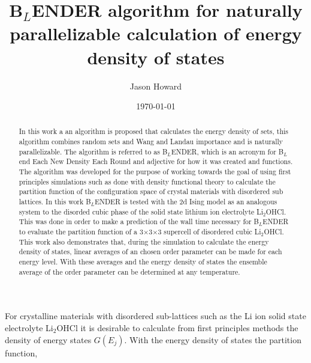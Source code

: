 \documentclass[aps,prl,reprint,superscriptaddress,showkeys]{revtex4-1}
\begin{document}
\title{B$_L$ENDER algorithm for naturally parallelizable calculation of energy density of states}

\author{Jason Howard}

\date{\today}

%


\begin{acknowledgments}
\end{acknowledgments}
\begin{abstract}
In this work a an algorithm is proposed that calculates the energy density of sets, this algorithm combines random sets and Wang and Landau importance  and is naturally parallelizable. The algorithm is referred to as B$_L$ENDER, which is an acronym for B$_L$end Each New Density Each Round and  adjective for  how it was created and functions. The algorithm was developed for the purpose of working towards the goal of using first principles simulations such as done with density functional theory to calculate the partition function of the configuration space of crystal materials with disordered sub lattices. In this work  B$_L$ENDER  is tested with the 2d Ising model as an analogous system to the disorded cubic phase of the solid state lithium ion electrolyte Li$_2$OHCl. This was done in order to make a prediction of the  wall time necessary for B$_L$ENDER to evaluate the partition function of a 3$\times$3$\times$3 supercell of disordered cubic Li$_2$OHCl. This work also demonstrates that, during the simulation to calculate the energy density of states, linear averages of an chosen order parameter can be made for each energy level. With these averages and the energy density of states the ensemble average of the order parameter can be determined at any temperature. 
\end{abstract}
\maketitle
For crystalline  materials  with disordered sub-lattices such as the Li ion solid state electrolyte  Li$_2$OHCl it is desirable to calculate from first principles methods the density of energy states $G(E_j)$. With the energy density of states the partition function,
\end{document}
